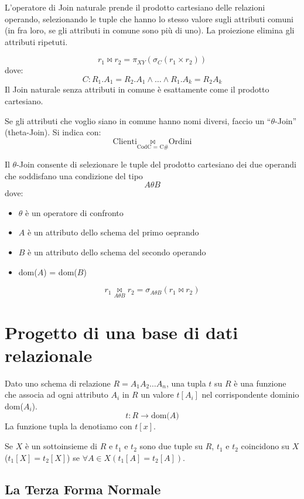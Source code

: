 L'operatore di Join naturale prende il prodotto cartesiano delle relazioni operando, selezionando le tuple che hanno lo stesso valore sugli attributi comuni (in  fra loro, se gli attributi in comune sono pi\`u di uno). La proiezione elimina gli attributi ripetuti.

\[
r_1 \Join r_2 = \pi_{XY} \left( \sigma_{C} \left( r_1 \times r_2 \right) \right)
\]
dove:
\[
C: R_1 . A_1 = R_2 . A_1 \land \dots \land R_1 . A_k = R_2 A_k
\]
Il Join naturale senza attributi in comune \`e esattamente come il prodotto cartesiano.

Se gli attributi che voglio siano in comune hanno nomi diversi, faccio un ``$\theta$-Join'' (theta-Join). Si indica con:
\[
\text{Clienti} \underset{\text{CodC } = \text{ C\#}}{\Join} \text{Ordini}
\]

Il $\theta$-Join consente di selezionare le tuple del prodotto cartesiano dei due operandi che soddisfano una condizione del tipo 
\[
A \theta B
\]
dove:
\begin{itemize}
    \item $\theta$ \`e un operatore di confronto
    \item $A$ \`e un attributo dello schema del primo oeprando
    \item $B$ \`e un attributo dello schema del secondo operando
    \item dom($A$) = dom($B$)
\end{itemize}
\[
r_1 \underset{A \theta B}{\Join} r_2 = \sigma_{A \theta B} \left( r_1 \Join r_2 \right)
\]

\chapter{Progetto di una base di dati relazionale}

Dato uno schema di relazione $R = A_1 A_2 \dots A_n$, una tupla $t$ su $R$ \`e una funzione che associa ad ogni attributo $A_i$ in $R$ un valore $t[A_i]$ nel corrispondente dominio dom($A_i$).
\[
t : R \to \text{dom($A$)}
\]
La funzione tupla la denotiamo con $t[x]$.

Se $X$ \`e un sottoinsieme di $R$ e $t_1$ e $t_2$ sono due tuple su $R$, $t_1$ e $t_2$ coincidono su $X$ ($t_1[X] = t_2[X]$) se $\forall A \in X (t_1[A] = t_2[A])$.

\section{La Terza Forma Normale}

